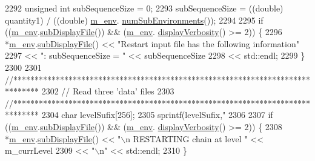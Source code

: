 \begin{DoxyCode}
2292   \textcolor{keywordtype}{unsigned} \textcolor{keywordtype}{int} subSequenceSize = 0;
2293   subSequenceSize = ((double) quantity1) / ((double) \hyperlink{class_q_u_e_s_o_1_1_m_l_sampling_a13f1ca4fe9f94822fe572a743eaced1d}{m\_env}.
      \hyperlink{class_q_u_e_s_o_1_1_base_environment_ac0345f57e31ef7833e379ed972bd094d}{numSubEnvironments}());
2294 
2295   \textcolor{keywordflow}{if} ((\hyperlink{class_q_u_e_s_o_1_1_m_l_sampling_a13f1ca4fe9f94822fe572a743eaced1d}{m\_env}.\hyperlink{class_q_u_e_s_o_1_1_base_environment_a8a0064746ae8dddfece4229b9ad374d6}{subDisplayFile}()) && (\hyperlink{class_q_u_e_s_o_1_1_m_l_sampling_a13f1ca4fe9f94822fe572a743eaced1d}{m\_env}.
      \hyperlink{class_q_u_e_s_o_1_1_base_environment_a1fe5f244fc0316a0ab3e37463f108b96}{displayVerbosity}() >= 2)) \{
2296     *\hyperlink{class_q_u_e_s_o_1_1_m_l_sampling_a13f1ca4fe9f94822fe572a743eaced1d}{m\_env}.\hyperlink{class_q_u_e_s_o_1_1_base_environment_a8a0064746ae8dddfece4229b9ad374d6}{subDisplayFile}() << \textcolor{stringliteral}{"Restart input file has the following information"}
2297                             << \textcolor{stringliteral}{": subSequenceSize = "} << subSequenceSize
2298                             << std::endl;
2299   \}
2300 
2301   \textcolor{comment}{//******************************************************************************}
2302   \textcolor{comment}{// Read three 'data' files}
2303   \textcolor{comment}{//******************************************************************************}
2304   \textcolor{keywordtype}{char} levelSufix[256];
2305   sprintf(levelSufix,\textcolor{stringliteral}{"%
2306 
2307   \textcolor{keywordflow}{if} ((\hyperlink{class_q_u_e_s_o_1_1_m_l_sampling_a13f1ca4fe9f94822fe572a743eaced1d}{m\_env}.\hyperlink{class_q_u_e_s_o_1_1_base_environment_a8a0064746ae8dddfece4229b9ad374d6}{subDisplayFile}()) && (\hyperlink{class_q_u_e_s_o_1_1_m_l_sampling_a13f1ca4fe9f94822fe572a743eaced1d}{m\_env}.
      \hyperlink{class_q_u_e_s_o_1_1_base_environment_a1fe5f244fc0316a0ab3e37463f108b96}{displayVerbosity}() >= 2)) \{
2308     *\hyperlink{class_q_u_e_s_o_1_1_m_l_sampling_a13f1ca4fe9f94822fe572a743eaced1d}{m\_env}.\hyperlink{class_q_u_e_s_o_1_1_base_environment_a8a0064746ae8dddfece4229b9ad374d6}{subDisplayFile}() << \textcolor{stringliteral}{"\(\backslash\)n RESTARTING chain at level "} << m\_currLevel
2309                             << \textcolor{stringliteral}{"\(\backslash\)n"} << std::endl;
2310   \}
}
\end{DoxyCode}
